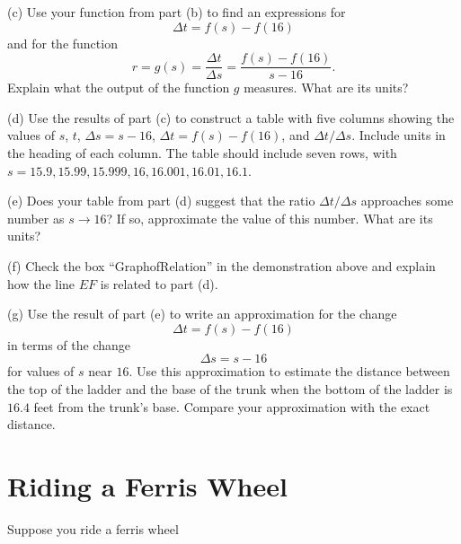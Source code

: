 \documentclass{ximera}
\begin{document}
\begin{example}
(c) Use your function from part (b) to find an expressions for
\[
  \Delta t = f(s) - f(16)
\]
and for the function
\[
  r = g(s) = \frac{\Delta t}{\Delta s} = \frac{f(s) - f(16)}{s-16} .
\]
Explain what the output of the function $g$ measures. What are its units?


(d) Use the results of part (c) to construct a table with five columns showing the values of $s$, $t$, $\Delta s = s-16$, $\Delta t =f(s)-f(16)$, and $\Delta t / \Delta s$. Include units in the heading of each column. The table should include seven rows, with $s=15.9,15.99, 15.999, 16, 16.001, 16.01, 16.1$.

(e) Does  your table from part (d) suggest that the ratio $\Delta t/ \Delta s$ approaches some number as $s \to 16$? If so, approximate the value of this number. What are its units?

(f) Check the box ``GraphofRelation'' in the demonstration above and explain how the line $EF$ is related to part (d).

(g) Use the result of part (e) to write an approximation for the change
\[
   \Delta t = f(s)- f(16)
\]
in terms of the change
\[
  \Delta s = s - 16  
\]  
for values of $s$ near $16$. Use this approximation to estimate the distance between the top of the ladder and the base of the trunk when the bottom of the ladder is $16.4$ feet from the trunk's base. Compare your approximation with the exact distance.

\end{example}





\section{Riding a Ferris Wheel}


Suppose  you ride a ferris wheel
\end{document}
